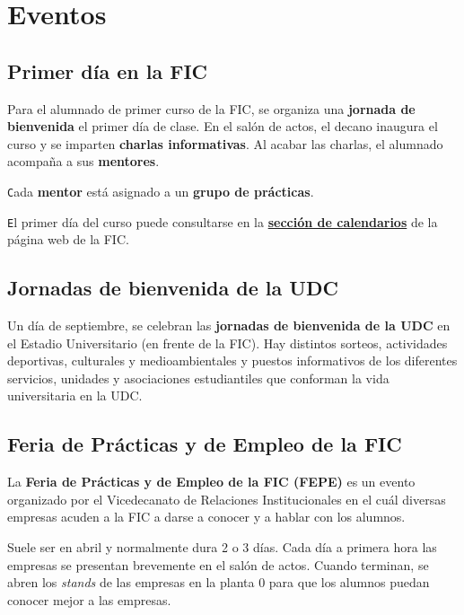 \chapter{Eventos}

\section{Primer día en la FIC}
Para el alumnado de primer curso de la \acrshort{FIC}, se organiza una \textbf{jornada de bienvenida} el primer día de clase. En el salón de actos, el decano inaugura el curso y se imparten \textbf{charlas informativas}. Al acabar las charlas, el alumnado acompaña a sus \textbf{mentores}.

\begin{infoBox}
    \texttt Cada \textbf{mentor} está asignado a un \textbf{grupo de prácticas}.
\end{infoBox}

\begin{rememberBox}
    \texttt El primer día del curso puede consultarse en la \href{https://www.fic.udc.es/gl/calendarios}{\textbf{sección de calendarios}} de la página web de la \acrshort{FIC}.
\end{rememberBox}


\section{Jornadas de bienvenida de la UDC}
Un día de septiembre, se celebran las \textbf{jornadas de bienvenida de la \acrshort{UDC}} en el Estadio Universitario (en frente de la \acrshort{FIC}). Hay distintos sorteos, actividades deportivas, culturales y medioambientales y puestos informativos de los diferentes servicios, unidades y asociaciones estudiantiles que conforman la vida universitaria en la \acrshort{UDC}.


\section{Feria de Prácticas y de Empleo de la FIC}

La \textbf{Feria de Prácticas y de Empleo de la \acrshort{FIC} (\acrshort{FEPE})} es un evento organizado por el Vicedecanato de Relaciones Institucionales en el cuál diversas empresas acuden a la \acrshort{FIC} a darse a conocer y a hablar con los alumnos.

Suele ser en abril y normalmente dura 2 o 3 días. Cada día a primera hora las empresas se presentan brevemente en el salón de actos. Cuando terminan, se abren los \textit{stands} de las empresas en la planta 0 para que los alumnos puedan conocer mejor a las empresas.

